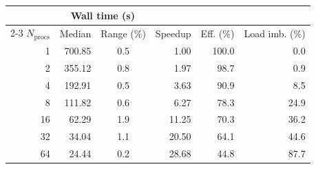 \begin{tabular}{@{}r@{\quad}r@{\enspace}c@{\quad}r@{\quad}r@{\quad}r@{}}
  \hline
   & \multicolumn{2}{c}{Wall time (s)} &  &  &  \\
  \cline{2-3}
  $N_{\mathrm{procs}}$ & Median & Range (\%) & Speedup & Eff. (\%) & Load imb. (\%) \\
  \hline
  1 & 700.85 & 0.5 & 1.00 & 100.0 & 0.0 \\
  2 & 355.12 & 0.8 & 1.97 & 98.7 & 0.9 \\
  4 & 192.91 & 0.5 & 3.63 & 90.9 & 8.5 \\
  8 & 111.82 & 0.6 & 6.27 & 78.3 & 24.9 \\
  16 & 62.29 & 1.9 & 11.25 & 70.3 & 36.2 \\
  32 & 34.04 & 1.1 & 20.50 & 64.1 & 44.6 \\
  64 & 24.44 & 0.2 & 28.68 & 44.8 & 87.7 \\
  \hline
\end{tabular}
